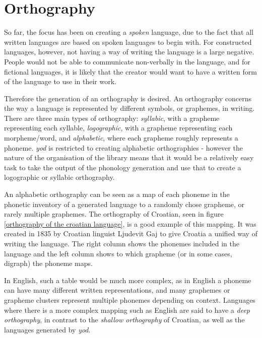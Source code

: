 \documentclass{report}
\begin{document}
	\chapter{Orthography}
	
	So far, the focus has been on creating a \textit{spoken} language, due to the fact that all written languages are based on spoken languages to begin with. For constructed languages, however, not having a way of writing the language is a large negative. People would not be able to communicate non-verbally in the language, and for fictional languages, it is likely that the creator would want to have a written form of the language to use in their work.
	
	Therefore the generation of an orthography is desired. An orthography concerns the way a language is represented by different symbols, or graphemes, in writing. There are three main types of orthography: \textit{syllabic}, with a grapheme representing each syllable, \textit{logographic}, with a grapheme representing each morpheme/word, and \textit{alphabetic}, where each grapheme roughly represents a phoneme. \textit{yod} is restricted to creating alphabetic orthographies - however the nature of the organisation of the library means that it would be a relatively easy task to take the output of the phonology generation and use that to create a logographic or syllabic orthography.
	
	An alphabetic orthography can be seen as a map of each phoneme in the phonetic inventory of a generated language to a randomly chose grapheme, or rarely multiple graphemes. The orthography of Croatian, seen in figure \ref{orthography of the croatian language}, is a good example of this mapping. It was created in 1835 by Croatian linguist Ljudevit Gaj to give Croatia a unified way of writing the language. The right column shows the phonemes included in the language and the left column shows to which grapheme (or in some cases, digraph) the phoneme maps.
	
	In English, such a table would be much more complex, as in English a phoneme can have many different written representations, and many graphemes or grapheme clusters represent multiple phonemes depending on context. Languages where there is a more complex mapping such as English are said to have a \textit{deep orthography}, in contrast to the \textit{shallow orthography} of Croatian, as well as the languages generated by \textit{yod}.
	
\end{document}
